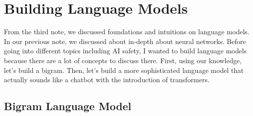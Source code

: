 \documentclass[../../../main.tex]{subfiles}
\begin{document}
\chapter{Building Language Models}

From the third note, we discussed foundations and intuitions on
language models. In our previous note, we discussed about in-depth
about neural networks. Before going into different topics including
AI safety, I wanted to build language models because there are
a lot of concepts to discuss there. First, using our knowledge,
let's build a bigram. Then, let's build a more sophisticated
language model that actually sounds like a chatbot with the
introduction of transformers.

\section{Bigram Language Model}
\end{document}
